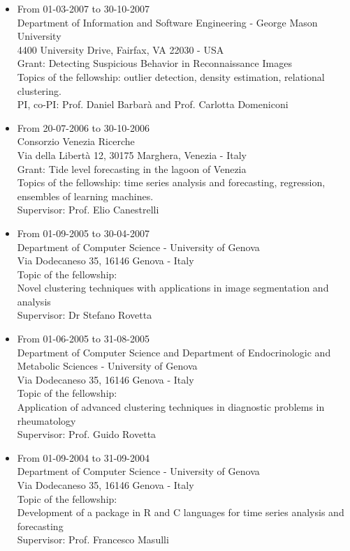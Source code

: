 \documentclass[a4paper,10pt]{article}
\begin{document}
\begin{itemize}
\item From 01-03-2007 to 30-10-2007 \\
  Department of Information and Software Engineering - George Mason University \\
  4400 University Drive, Fairfax, VA 22030 - USA \\
  Grant: Detecting Suspicious Behavior in Reconnaissance Images \\
  Topics of the fellowship: outlier detection, density estimation, relational clustering. \\
  PI, co-PI: Prof. Daniel Barbar\`a and Prof. Carlotta Domeniconi

\item From 20-07-2006 to 30-10-2006 \\
  Consorzio Venezia Ricerche \\
  Via della Libert\`a 12, 30175 Marghera, Venezia - Italy \\
  Grant: Tide level forecasting in the lagoon of Venezia \\ 
  Topics of the fellowship: time series analysis and forecasting, regression, ensembles of learning machines. \\
  Supervisor: Prof. Elio Canestrelli

\item From 01-09-2005 to 30-04-2007 \\
  Department of Computer Science - University of Genova \\
  Via Dodecaneso 35, 16146 Genova - Italy \\
  Topic of the fellowship: \\
  Novel clustering techniques with applications in image segmentation and analysis \\
  Supervisor: Dr Stefano Rovetta

\item From 01-06-2005 to 31-08-2005 \\
  Department of Computer Science and Department of Endocrinologic and Metabolic Sciences - University of Genova \\
  Via Dodecaneso 35, 16146 Genova - Italy \\
  Topic of the fellowship: \\
  Application of advanced clustering techniques in diagnostic problems in rheumatology \\
  Supervisor: Prof. Guido Rovetta

\item From 01-09-2004 to 31-09-2004 \\
  Department of Computer Science - University of Genova \\
  Via Dodecaneso 35, 16146 Genova - Italy \\
  Topic of the fellowship: \\
  Development of a package in R and C languages for time series analysis and forecasting \\
  Supervisor: Prof. Francesco Masulli


\end{itemize}
\end{document}
